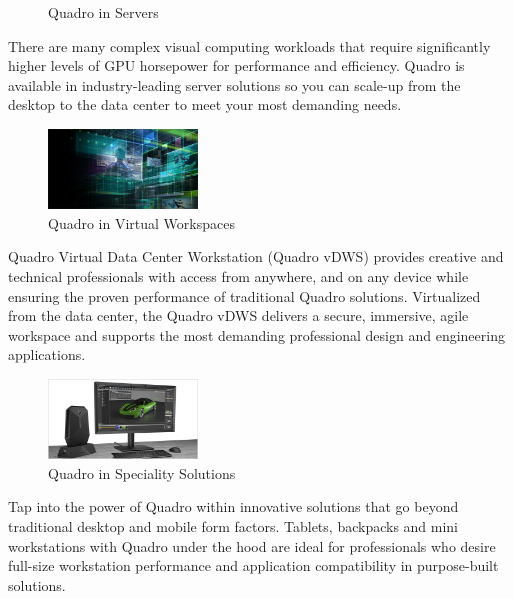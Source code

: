 \documentclass[xcolor=x11names,table]{beamer}
\begin{document}
\begin{frame}[allowframebreaks]
\begin{block}
{\begin{figure}[H]
            	\caption{{\footnotesize Quadro in Servers}}
            \end{figure}
            }
            {
                There are many complex visual computing workloads that require significantly higher levels of GPU horsepower for performance and efficiency. Quadro is available in industry-leading server solutions so you can scale-up from the desktop to the data center to meet your most demanding needs.
            }
        \end{block}
        \begin{block}{
            \begin{figure}[H]
            	\includegraphics[width=150px]{refs/quadro-whats-new-feature-vdws-625-ud@2x.jpg}
            	\caption{{\footnotesize Quadro in Virtual Workspaces}}
            \end{figure}
            }
            {
                Quadro Virtual Data Center Workstation (Quadro vDWS) provides creative and technical professionals with access from anywhere, and on any device while ensuring the proven performance of traditional Quadro solutions. Virtualized from the data center, the Quadro vDWS delivers a secure, immersive, agile workspace and supports the most demanding professional design and engineering applications.
            }
        \end{block}
        \begin{block}{
            \begin{figure}[H]
            	\includegraphics[width=150px]{refs/quadro-whats-new-feature-specialty-625-ud@2x.jpg}
            	\caption{{\footnotesize Quadro in Speciality Solutions}}
            \end{figure}
            }
            {
                Tap into the power of Quadro within innovative solutions that go beyond traditional desktop and mobile form factors. Tablets, backpacks and mini workstations with Quadro under the hood are ideal for professionals who desire full-size workstation performance and application compatibility in purpose-built solutions.
            }
        \end{block}


    \end{frame}
\end{document}

